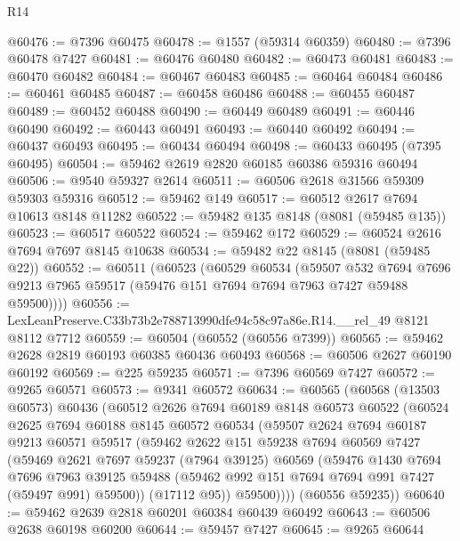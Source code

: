 \begin{lexlean}{R14}
\begin{coremodule}
@60476 := @7396 @60475
@60478 := @1557 (@59314 @60359)
@60480 := @7396 @60478 @7427
@60481 := @60476 @60480
@60482 := @60473 @60481
@60483 := @60470 @60482
@60484 := @60467 @60483
@60485 := @60464 @60484
@60486 := @60461 @60485
@60487 := @60458 @60486
@60488 := @60455 @60487
@60489 := @60452 @60488
@60490 := @60449 @60489
@60491 := @60446 @60490
@60492 := @60443 @60491
@60493 := @60440 @60492
@60494 := @60437 @60493
@60495 := @60434 @60494
@60498 := @60433 @60495 (@7395 @60495)
@60504 := @59462 @2619 @2820 @60185 @60386 @59316 @60494
@60506 := @9540 @59327 @2614
@60511 := @60506 @2618 @31566 @59309 @59303 @59316
@60512 := @59462 @149
@60517 := @60512 @2617 @7694 @10613 @8148 @11282
@60522 := @59482 @135 @8148 (@8081 (@59485 @135))
@60523 := @60517 @60522
@60524 := @59462 @172
@60529 := @60524 @2616 @7694 @7697 @8145 @10638
@60534 := @59482 @22 @8145 (@8081 (@59485 @22))
@60552 := @60511
    (@60523
      (@60529
        @60534
        (@59507
          @532
          @7694
          @7696
          @9213
          @7965
          @59517
          (@59476 @151 @7694 @7694 @7963 @7427 @59488 @59500))))
@60556 := LexLeanPreserve.C33b73b2e788713990dfe94c58c97a86e.R14.__rel_49 @8121 @8112 @7712
@60559 := @60504 (@60552 (@60556 @7399))
@60565 := @59462 @2628 @2819 @60193 @60385 @60436 @60493
@60568 := @60506 @2627 @60190 @60192
@60569 := @225 @59235
@60571 := @7396 @60569 @7427
@60572 := @9265 @60571
@60573 := @9341 @60572
@60634 := @60565
    (@60568
      (@13503 @60573)
      @60436
      (@60512
        @2626
        @7694
        @60189
        @8148
        @60573
        @60522
        (@60524
          @2625
          @7694
          @60188
          @8145
          @60572
          @60534
          (@59507
            @2624
            @7694
            @60187
            @9213
            @60571
            @59517
            (@59462
              @2622
              @151
              @59238
              @7694
              @60569
              @7427
              (@59469
                @2621
                @7697
                @59237
                (@7964 @39125)
                @60569
                (@59476
                  @1430
                  @7694
                  @7696
                  @7963
                  @39125
                  @59488
                  (@59462 @992 @151 @7694 @7694 @991 @7427 (@59497 @991) @59500))
                (@17112 @95))
              @59500))))
      (@60556 @59235))
@60640 := @59462 @2639 @2818 @60201 @60384 @60439 @60492
@60643 := @60506 @2638 @60198 @60200
@60644 := @59457 @7427
@60645 := @9265 @60644

\end{coremodule}
\end{lexlean}

